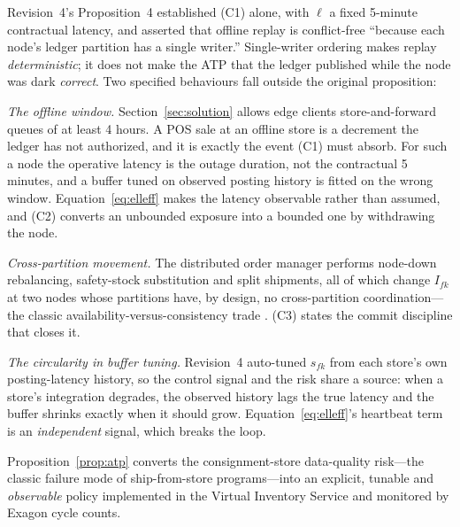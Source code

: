 \begin{remark}
Revision~4's Proposition~4 established (C1) alone, with $\ell$ a fixed 5-minute contractual latency, and asserted that offline replay is conflict-free ``because each node's ledger partition has a single writer.'' Single-writer ordering makes replay \emph{deterministic}; it does not make the ATP that the ledger published while the node was dark \emph{correct}. Two specified behaviours fall outside the original proposition:

\emph{The offline window.} Section~\ref{sec:solution} allows edge clients store-and-forward queues of at least 4 hours. A POS sale at an offline store is a decrement the ledger has not authorized, and it is exactly the event (C1) must absorb. For such a node the operative latency is the outage duration, not the contractual 5 minutes, and a buffer tuned on observed posting history is fitted on the wrong window. Equation~\eqref{eq:elleff} makes the latency observable rather than assumed, and (C2) converts an unbounded exposure into a bounded one by withdrawing the node.

\emph{Cross-partition movement.} The distributed order manager performs node-down rebalancing, safety-stock substitution and split shipments, all of which change $I_{fk}$ at two nodes whose partitions have, by design, no cross-partition coordination---the classic availability-versus-consistency trade \cite{gilbert2002}. (C3) states the commit discipline that closes it.

\emph{The circularity in buffer tuning.} Revision~4 auto-tuned $s_{fk}$ from each store's own posting-latency history, so the control signal and the risk share a source: when a store's integration degrades, the observed history lags the true latency and the buffer shrinks exactly when it should grow. Equation~\eqref{eq:elleff}'s heartbeat term is an \emph{independent} signal, which breaks the loop. 
\end{remark}

Proposition~\ref{prop:atp} converts the consignment-store data-quality risk---the classic failure mode of ship-from-store programs---into an explicit, tunable and \emph{observable} policy implemented in the Virtual Inventory Service and monitored by Exagon cycle counts.

